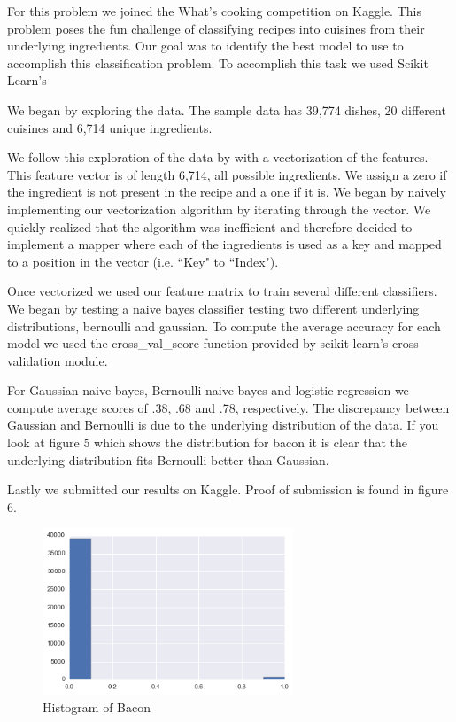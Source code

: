 \documentclass[12pt]{report}
\begin{document}
For this problem we joined the What's cooking competition on Kaggle. This problem poses the fun challenge of classifying recipes into cuisines from their underlying ingredients. Our goal was to identify the best model to use to accomplish this classification problem. To accomplish this task we used Scikit Learn's

We began by exploring the data. The sample data has 39,774 dishes, 20 different cuisines and 6,714 unique ingredients.

We follow this exploration of the data by with a vectorization of the features. This feature vector is of length 6,714, all possible ingredients. We assign a zero if the ingredient is not present in the recipe and a one if it is. We began by naively implementing our vectorization algorithm by iterating through the vector. We quickly realized that the algorithm was inefficient and therefore decided to implement a mapper where each of the ingredients is used as a key and mapped to a position in the vector (i.e. ``Key" to ``Index").

Once vectorized we used our feature matrix to train several different classifiers. We began by testing a naive bayes classifier testing two different underlying distributions, bernoulli and gaussian. To compute the average accuracy for each model we used the cross\_val\_score function provided by scikit learn's cross validation module.

For Gaussian naive bayes, Bernoulli naive bayes and logistic regression we compute average scores of .38, .68 and .78, respectively. The discrepancy between Gaussian and Bernoulli is due to the underlying distribution of the data. If you look at figure 5 which shows the distribution for bacon it is clear that the underlying distribution fits Bernoulli better than Gaussian.

Lastly we submitted our results on Kaggle. Proof of submission is found in figure 6.

\begin{figure}
\centering
  \includegraphics[width=75mm]{figures/bernouli.png}
\caption{Histogram of Bacon}
\end{figure}
\end{document}
